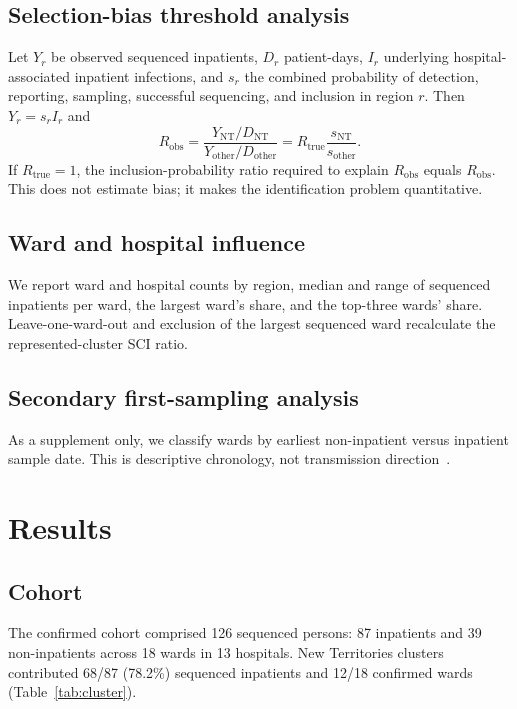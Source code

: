\documentclass[11pt]{article}
\begin{document}
\subsection{Selection-bias threshold analysis}
Let $Y_r$ be observed sequenced inpatients, $D_r$ patient-days, $I_r$ underlying hospital-associated inpatient infections, and $s_r$ the combined probability of detection, reporting, sampling, successful sequencing, and inclusion in region $r$.
Then $Y_r = s_r I_r$ and
\begin{equation}
R_{\mathrm{obs}}
=
\frac{Y_{\mathrm{NT}}/D_{\mathrm{NT}}}{Y_{\mathrm{other}}/D_{\mathrm{other}}}
=
R_{\mathrm{true}}
\frac{s_{\mathrm{NT}}}{s_{\mathrm{other}}}.
\label{eq:selection}
\end{equation}
If $R_{\mathrm{true}}=1$, the inclusion-probability ratio required to explain $R_{\mathrm{obs}}$ equals $R_{\mathrm{obs}}$.
This does not estimate bias; it makes the identification problem quantitative.

\subsection{Ward and hospital influence}
We report ward and hospital counts by region, median and range of sequenced inpatients per ward, the largest ward's share, and the top-three wards' share.
Leave-one-ward-out and exclusion of the largest sequenced ward recalculate the represented-cluster SCI ratio.

\subsection{Secondary first-sampling analysis}
As a supplement only, we classify wards by earliest non-inpatient versus inpatient sample date.
This is descriptive chronology, not transmission direction~\cite{lindsey2022natcomms,ellingford2021elife}.

\section{Results}

\subsection{Cohort}
The confirmed cohort comprised 126 sequenced persons: 87 inpatients and 39 non-inpatients across 18 wards in 13 hospitals.
New Territories clusters contributed 68/87 (78.2\%) sequenced inpatients and 12/18 confirmed wards (Table~\ref{tab:cluster}).
\end{document}
